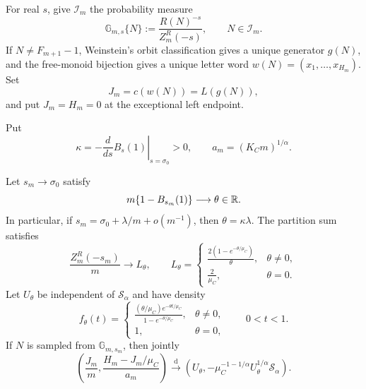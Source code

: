 For real \(s\), give \(\mathcal I_m\) the probability measure
\begin{equation}
 \mathbb G_{m,s}\{N\}:=
 \frac{R(N)^{-s}}{Z_m^R(-s)},
 \qquad N\in\mathcal I_m.
 \label{eq:fibonacci-gibbs-measure}
\end{equation}
If \(N\ne F_{m+1}-1\), Weinstein's orbit classification gives a unique
generator \(g(N)\), and the free-monoid bijection gives a unique letter word
\(w(N)=(x_1,\ldots,x_{H_m})\).  Set
\[
 J_m=c(w(N))=L(g(N)),
\]
and put \(J_m=H_m=0\) at the exceptional left endpoint.

Put
\[
 \kappa=-\left.\frac{d}{ds}B_s(1)\right|_{s=\sigma_0}>0,
 \qquad a_m=(K_Cm)^{1/\alpha}.
\]

\begin{theorem}
\label{thm:finite-size-fibonacci-crossover}
Let \(s_m\to\sigma_0\) satisfy
\begin{equation}
 m\{1-B_{s_m}(1)\}\longrightarrow\theta\in\mathbb{R}.
 \label{eq:finite-size-crossover-window}
\end{equation}
In particular, if \(s_m=\sigma_0+\lambda/m+o(m^{-1})\), then
\(\theta=\kappa\lambda\).  The partition sum satisfies
\begin{equation}
 \frac{Z_m^R(-s_m)}m\longrightarrow L_\theta,
 \qquad
 L_\theta=
 \begin{cases}
 \displaystyle\frac{2(1-e^{-\theta/\mu_C})}{\theta},&\theta\ne0,\\[6pt]
 \displaystyle\frac2{\mu_C},&\theta=0.
 \end{cases}
 \label{eq:finite-size-crossover-normalizer}
\end{equation}
Let \(U_\theta\) be independent of \(\mathcal S_\alpha\) and have density
\begin{equation}
 f_\theta(t)=
 \begin{cases}
 \displaystyle
 \frac{(\theta/\mu_C)e^{-\theta t/\mu_C}}
 {1-e^{-\theta/\mu_C}},&\theta\ne0,\\[7pt]
 1,&\theta=0,
 \end{cases}
 \qquad 0<t<1.
 \label{eq:finite-size-crossover-location-density}
\end{equation}
If \(N\) is sampled from \(\mathbb G_{m,s_m}\), then jointly
\begin{equation}
 \left(\frac{J_m}{m},
       \frac{H_m-J_m/\mu_C}{a_m}\right)
 \xrightarrow{\mathrm d}
 \left(U_\theta,
 -\mu_C^{-1-1/\alpha}U_\theta^{1/\alpha}\mathcal S_\alpha\right).
 \label{eq:finite-size-fibonacci-crossover}
\end{equation}
\end{theorem}

